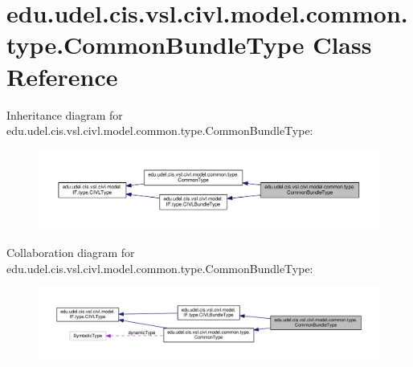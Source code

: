 \hypertarget{classedu_1_1udel_1_1cis_1_1vsl_1_1civl_1_1model_1_1common_1_1type_1_1CommonBundleType}{}\section{edu.\+udel.\+cis.\+vsl.\+civl.\+model.\+common.\+type.\+Common\+Bundle\+Type Class Reference}
\label{classedu_1_1udel_1_1cis_1_1vsl_1_1civl_1_1model_1_1common_1_1type_1_1CommonBundleType}


Inheritance diagram for edu.\+udel.\+cis.\+vsl.\+civl.\+model.\+common.\+type.\+Common\+Bundle\+Type\+:
\nopagebreak
\begin{figure}[H]
\begin{center}
\leavevmode
\includegraphics[width=350pt]{classedu_1_1udel_1_1cis_1_1vsl_1_1civl_1_1model_1_1common_1_1type_1_1CommonBundleType__inherit__graph}
\end{center}
\end{figure}


Collaboration diagram for edu.\+udel.\+cis.\+vsl.\+civl.\+model.\+common.\+type.\+Common\+Bundle\+Type\+:
\nopagebreak
\begin{figure}[H]
\begin{center}
\leavevmode
\includegraphics[width=350pt]{classedu_1_1udel_1_1cis_1_1vsl_1_1civl_1_1model_1_1common_1_1type_1_1CommonBundleType__coll__graph}
\end{center}
\end{figure}
